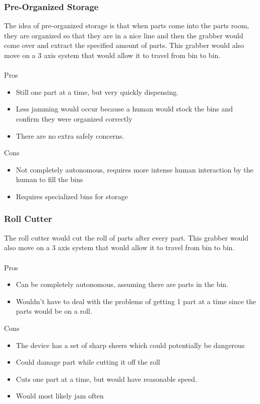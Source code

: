 \documentclass[12pt]{report}
\begin{document}
\subsubsection*{Pre-Organized Storage}
The idea of pre-organized storage is that when parts come into the parts room, they are organized so that they are in a nice line and then the grabber would come over and extract the specified amount of parts. This grabber would also move on a 3 axis system that would allow it to travel from bin to bin.\\ \\
Pros
\begin{itemize}
\item Still one part at a time, but very quickly dispensing.
\item Less jamming would occur because a human would stock the bins and confirm they were organized correctly
\item There are no extra safely concerns.
\end{itemize}
Cons
\begin{itemize}
\item Not completely autonomous, requires more intense human interaction by the human to fill the bins
\item Requires specialized bins for storage
\end{itemize}

\subsubsection*{Roll Cutter}
The roll cutter would cut the roll of parts after every part. This grabber would also move on a 3 axis system that would allow it to travel from bin to bin. \\ \\
Pros
\begin{itemize}
\item Can be completely autonomous, assuming there are parts in the bin. 
\item Wouldn't have to deal with the problems of getting 1 part at a time since the parts would be on a roll.
\end{itemize}
Cons
\begin{itemize}
\item The device has a set of sharp sheers which could potentially be dangerous
\item Could damage part while cutting it off the roll
\item Cuts one part at a time, but would have reasonable speed. 
\item Would most likely jam often
\end{itemize}
\end{document}
